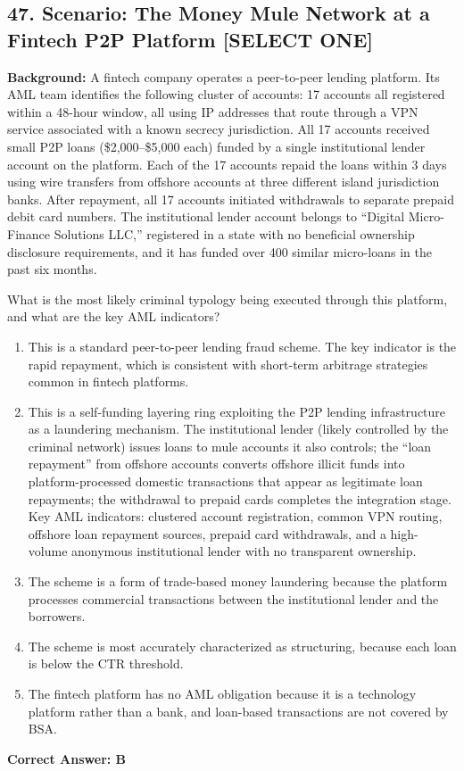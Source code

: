 \documentclass[11pt,a4paper]{article}
\begin{document}
	\subsection{47. Scenario: The Money Mule Network at a Fintech P2P Platform \textnormal{[SELECT ONE]}}
	
	\textbf{Background:} A fintech company operates a peer-to-peer lending platform. Its AML team identifies the following cluster of accounts: 17 accounts all registered within a 48-hour window, all using IP addresses that route through a VPN service associated with a known secrecy jurisdiction. All 17 accounts received small P2P loans (\$2,000--\$5,000 each) funded by a single institutional lender account on the platform. Each of the 17 accounts repaid the loans within 3 days using wire transfers from offshore accounts at three different island jurisdiction banks. After repayment, all 17 accounts initiated withdrawals to separate prepaid debit card numbers. The institutional lender account belongs to ``Digital Micro-Finance Solutions LLC,'' registered in a state with no beneficial ownership disclosure requirements, and it has funded over 400 similar micro-loans in the past six months.
	
	What is the most likely criminal typology being executed through this platform, and what are the key AML indicators?
	
	\begin{enumerate}[label=\Alph*.]
		\item This is a standard peer-to-peer lending fraud scheme. The key indicator is the rapid repayment, which is consistent with short-term arbitrage strategies common in fintech platforms.
		\item This is a self-funding layering ring exploiting the P2P lending infrastructure as a laundering mechanism. The institutional lender (likely controlled by the criminal network) issues loans to mule accounts it also controls; the ``loan repayment'' from offshore accounts converts offshore illicit funds into platform-processed domestic transactions that appear as legitimate loan repayments; the withdrawal to prepaid cards completes the integration stage. Key AML indicators: clustered account registration, common VPN routing, offshore loan repayment sources, prepaid card withdrawals, and a high-volume anonymous institutional lender with no transparent ownership.
		\item The scheme is a form of trade-based money laundering because the platform processes commercial transactions between the institutional lender and the borrowers.
		\item The scheme is most accurately characterized as structuring, because each loan is below the CTR threshold.
		\item The fintech platform has no AML obligation because it is a technology platform rather than a bank, and loan-based transactions are not covered by BSA.
	\end{enumerate}
	\textbf{Correct Answer: B}
	
\end{document}
